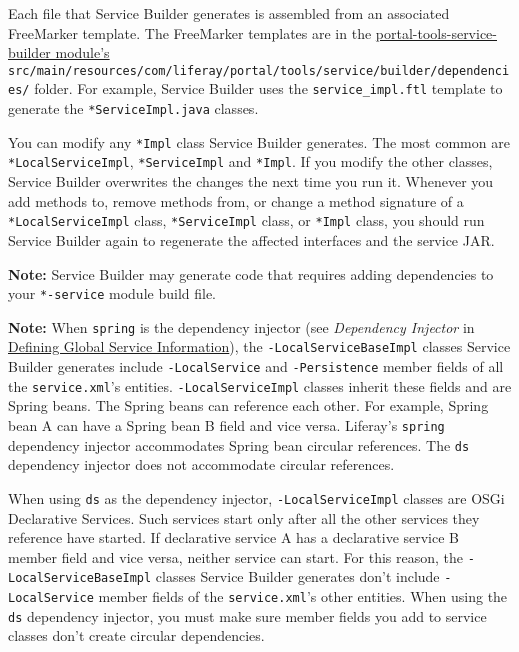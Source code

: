 \noindent\hrulefill

Each file that Service Builder generates is assembled from an associated
FreeMarker template. The FreeMarker templates are in the
\href{https://github.com/liferay/liferay-portal/tree/master/modules/util/portal-tools-service-builder}{portal-tools-service-builder
module's}
\texttt{src/main/resources/com/liferay/portal/tools/service/builder/dependencies/}
folder. For example, Service Builder uses the \texttt{service\_impl.ftl}
template to generate the \texttt{*ServiceImpl.java} classes.

You can modify any \texttt{*Impl} class Service Builder generates. The
most common are \texttt{*LocalServiceImpl}, \texttt{*ServiceImpl} and
\texttt{*Impl}. If you modify the other classes, Service Builder
overwrites the changes the next time you run it. Whenever you add
methods to, remove methods from, or change a method signature of a
\texttt{*LocalServiceImpl} class, \texttt{*ServiceImpl} class, or
\texttt{*Impl} class, you should run Service Builder again to regenerate
the affected interfaces and the service JAR.

\noindent\hrulefill

\textbf{Note:} Service Builder may generate code that requires adding
dependencies to your \texttt{*-service} module build file.

\noindent\hrulefill

\noindent\hrulefill

\textbf{Note:} When \texttt{spring} is the dependency injector (see
\emph{Dependency Injector} in
\href{/docs/7-2/appdev/-/knowledge_base/a/defining-global-service-information}{Defining
Global Service Information}), the \texttt{-LocalServiceBaseImpl} classes
Service Builder generates include \texttt{-LocalService} and
\texttt{-Persistence} member fields of all the \texttt{service.xml}'s
entities. \texttt{-LocalServiceImpl} classes inherit these fields and
are Spring beans. The Spring beans can reference each other. For
example, Spring bean A can have a Spring bean B field and vice versa.
Liferay's \texttt{spring} dependency injector accommodates Spring bean
circular references. The \texttt{ds} dependency injector does not
accommodate circular references.

When using \texttt{ds} as the dependency injector,
\texttt{-LocalServiceImpl} classes are OSGi Declarative Services. Such
services start only after all the other services they reference have
started. If declarative service A has a declarative service B member
field and vice versa, neither service can start. For this reason, the
\texttt{-LocalServiceBaseImpl} classes Service Builder generates don't
include \texttt{-LocalService} member fields of the
\texttt{service.xml}'s other entities. When using the \texttt{ds}
dependency injector, you must make sure member fields you add to service
classes don't create circular dependencies.

